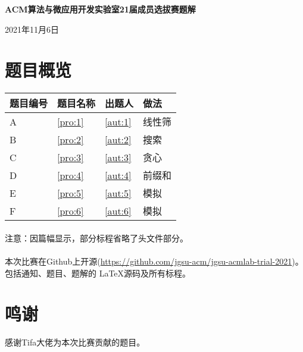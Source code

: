 \documentclass[
	lang=cn,
	color=blue
]{elegantbook}
\begin{document}
\begin{titlepage}
    \begin{center}
        \LARGE
        \textbf{ACM算法与微应用开发实验室21届成员选拔赛题解} \par
        \normalsize
        \vspace{0.5cm}
        2021年11月6日
    \end{center}

    \section*{题目概览}
    \begin{center}
        \begin{tabularx}{\textwidth}{M|M|M|M}
            \toprule
            \textbf{题目编号} & \textbf{题目名称} & \textbf{出题人} & \textbf{做法} \\
            \midrule
            A                 & \ref*{pro:1}      & \ref*{aut:1}    & 线性筛        \\
            B                 & \ref*{pro:2}      & \ref*{aut:2}    & 搜索          \\
            C                 & \ref*{pro:3}      & \ref*{aut:3}    & 贪心          \\
            D                 & \ref*{pro:4}      & \ref*{aut:4}    & 前缀和        \\
            E                 & \ref*{pro:5}      & \ref*{aut:5}    & 模拟          \\
            F                 & \ref*{pro:6}      & \ref*{aut:6}    & 模拟          \\
            \bottomrule
        \end{tabularx}
    \end{center}

    \paragraph*{} 注意：因篇幅显示，部分标程省略了头文件部分。
    \paragraph*{} 本次比赛在Github上开源(\url{https://github.com/jgsu-acm/jgsu-acmlab-trial-2021})。包括通知、题目、题解的 \LaTeX 源码及所有标程。

    \section*{鸣谢}
    感谢Tifa大佬为本次比赛贡献的题目。

\end{titlepage}
\end{document}
